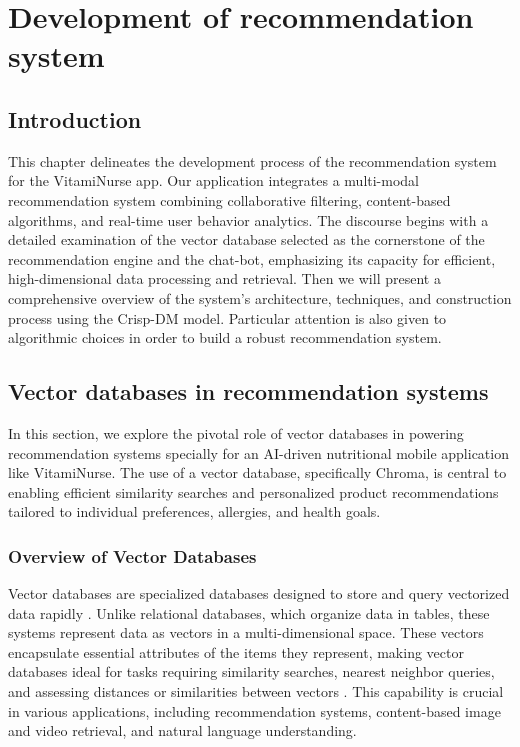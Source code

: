 \chapter{Development of recommendation system}
\section*{Introduction}
This chapter delineates the development process of the recommendation system for the VitamiNurse app. Our application integrates a multi-modal recommendation system combining collaborative filtering, content-based algorithms, and real-time user behavior analytics. The discourse begins with a detailed examination of the vector database selected as the cornerstone of the recommendation engine and the chat-bot, emphasizing its capacity for efficient, high-dimensional data processing and retrieval.
Then we will present a comprehensive overview of the system’s architecture, techniques, and construction process using the Crisp-DM model. Particular attention is also given to algorithmic choices in order to build a robust recommendation system.

\section{Vector databases in recommendation systems}
In this section, we explore the pivotal role of vector databases in powering recommendation systems specially for  an AI-driven nutritional mobile application like VitamiNurse. The use of a vector database, specifically Chroma, is central to enabling efficient similarity searches and personalized product recommendations tailored to individual preferences, allergies, and health goals.
\subsection{Overview of Vector Databases}
Vector databases are specialized databases designed to store and query vectorized data rapidly \cite{IBMVectordb2025}. Unlike relational databases, which organize data in tables, these systems represent data as vectors in a multi-dimensional space. These vectors encapsulate essential attributes of the items they represent, making vector databases ideal for tasks requiring similarity searches, nearest neighbor queries, and assessing distances or similarities between vectors \cite{IBMVectordb2025}. This capability is crucial in various applications, including recommendation systems, content-based image and video retrieval, and natural language understanding.

